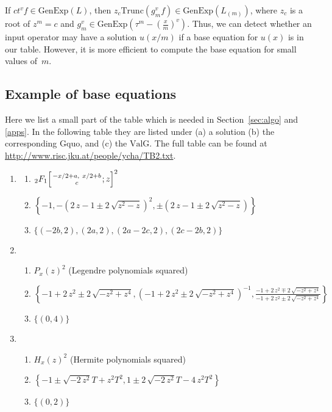 \documentclass{article}
\newcommand{\genexp}{\mathrm{GenExp}}
\newcommand{\valg}{\mathrm{ValG}}
\newcommand{\trunc}{\mathrm{Trunc}}
\newcommand{\Gq}{\mathrm{Gquo}}
\begin{document}
If $ct^vf \in \genexp(L)$, then $z_c\trunc(g_m^vf) \in \genexp(L_{(m)})$, where $z_c$ is a root of
$z^m=c$ and $g_m^v \in \genexp(\tau^m-(\frac{x}{m})^v)$.  Thus, we can detect whether an
input operator may have a solution $u(x/m)$ if a base equation for $u(x)$ is in our table.
However, it is more efficient to compute the base equation for small values of~$m$.




\subsection{Example of base equations}
\label{sec:base}

Here we list a small part of the table which is needed in Section~\ref{sec:algo} and \ref{apps}.  In the
following table they are listed under (a) a solution (b) the corresponding $\Gq$, and (c) the $\valg$. 
The full table can be found at
\url{http://www.risc.jku.at/people/ycha/TB2.txt}.



\begin{enumerate}


\item\label{ex2} 	
	\begin{enumerate}
	  \item ${}_2F_1\Big[\genfrac{}{}{0pt}{}{-x/2+a, \ x/2+b}{c}  ; z \Big]^2$
	  \item $ \left\{ -1,- \left( 2\,z-1\pm2\,\sqrt {{z}^{2}-z} \right) ^{2}, \pm(2\,z-1\pm2\,\sqrt {{z}^{2}-z}) \right\} 
 $
	  \item $\{ (-2b, 2), (2a, 2), (2a-2c, 2), (2c-2b, 2) \}$
	\end{enumerate}

\item 
	\begin{enumerate}\label{Legendre}
	  \item $P_x(z)^2$ (Legendre polynomials squared)
	  \item $\left\{ -1+2\,{z}^{2}\pm2\,\sqrt {-{z}^
{2}+{z}^{4}}, \left( -1+2\,{z}^{2}\pm2\,\sqrt {-{z}^{2}+{z}^{4}} \right) ^{
-1}, \frac{ -1+2\,{z}^{2}\mp2\,\sqrt {-{z}^{2}+{z}^{4}}}{ -1
+2\,{z}^{2}\pm2\,\sqrt {-{z}^{2}+{z}^{4}} } \right\} 
$
	  \item $\{(0, 4) \}$
	\end{enumerate}

\item
	\begin{enumerate}
	  \item $H_x(z)^2$ (Hermite polynomials squared)
	  \item $\left\{ -1\pm\sqrt {-2\,{z}^{2}}T+{z}^{2}{T}^{2},1\pm2\,\sqrt {-2\,{z}^{2}}T-4\,{z}^{2}{T}^{2}\right\} 
$
	  \item $\{(0, 2) \}$
	\end{enumerate}
\end{enumerate}
\end{document}
